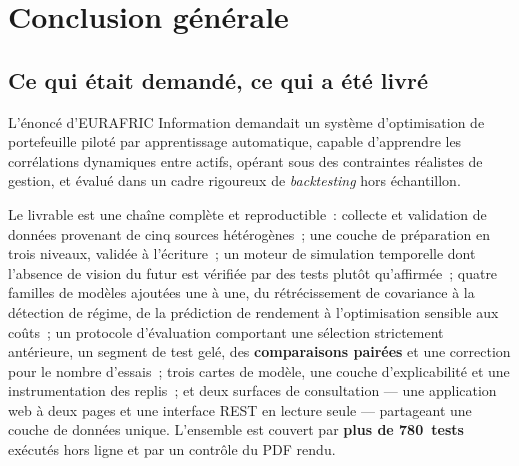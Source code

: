 %

\chapter*{Conclusion générale}
\label{chap:conclusion}

\section*{Ce qui était demandé, ce qui a été livré}

L'énoncé d'EURAFRIC Information demandait un système d'optimisation de
portefeuille piloté par apprentissage automatique, capable d'apprendre les
corrélations dynamiques entre actifs, opérant sous des contraintes réalistes de
gestion, et évalué dans un cadre rigoureux de \emph{backtesting} hors
échantillon.

Le livrable est une chaîne complète et reproductible~: collecte et validation de
données provenant de cinq sources hétérogènes~; une couche de préparation en
trois niveaux, validée à l'écriture~; un moteur de simulation temporelle dont
l'absence de vision du futur est vérifiée par des tests plutôt qu'affirmée~;
quatre familles de modèles ajoutées une à une, du rétrécissement de covariance à
la détection de régime, de la prédiction de rendement à l'optimisation sensible
aux coûts~; un protocole d'évaluation comportant une sélection strictement
antérieure, un segment de test gelé, des \textbf{comparaisons pairées} et une
correction pour le nombre d'essais~; trois cartes de modèle, une couche
d'explicabilité et une instrumentation des replis~; et deux surfaces de
consultation — une application web à deux pages et une interface REST en lecture
seule — partageant une couche de données unique. L'ensemble est couvert par
\textbf{plus de 780~tests} exécutés hors ligne et par un contrôle du PDF rendu.


